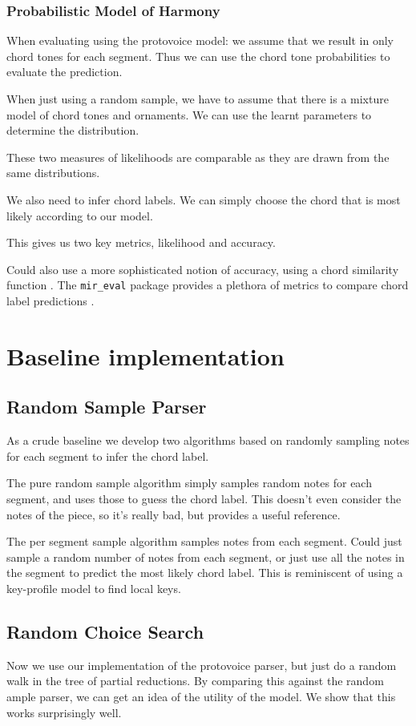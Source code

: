 \documentclass[12pt,a4paper,twoside,openright]{report}
\begin{document}
\subsubsection{Probabilistic Model of Harmony}
When evaluating using the protovoice model: we assume that we result in only chord tones for each segment. Thus we can use the chord tone probabilities to evaluate the prediction. 
\par
When just using a random sample, we have to assume that there is a mixture model of chord tones and ornaments. We can use the learnt parameters to determine the distribution.
\par
These two measures of likelihoods are comparable as they are drawn from the same distributions.
\par
We also need to infer chord labels. We can simply choose the chord that is most likely according to our model.
\par 
This gives us two key metrics, likelihood and accuracy.
\par
Could also use a more sophisticated notion of accuracy, using a chord similarity function \cite{humphreyFourTimelyInsights2015}. The {\texttt {mir\_eval}} package provides a plethora of metrics to compare chord label predictions \cite{raffelMirEvalTransparent2014}. 

\section{Baseline implementation}

\subsection{Random Sample Parser}
As a crude baseline we develop two algorithms based on randomly sampling notes for each segment to infer the chord label. 
\par
The pure random sample algorithm simply samples random notes for each segment, and uses those to guess the chord label. This doesn't even consider the notes of the piece, so it's really bad, but provides a useful reference.
\par 
The per segment sample algorithm samples notes from each segment. Could just sample a random number of notes from each segment, or just use all the notes in the segment to predict the most likely chord label. This is reminiscent of using a key-profile model \cite{temperleyBayesianApproachKeyFinding2002} to find local keys.

\subsection{Random Choice Search}
Now we use our implementation of the protovoice parser, but just do a random walk in the tree of partial reductions. By comparing this against the random ample parser, we can get an idea of the utility of the model. We show that this works surprisingly well.
\end{document}
